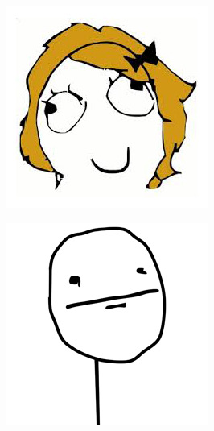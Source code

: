 \begin{multicols}{8}
\begin{center}
\includegraphics[width=\linewidth]{./IMG-GIT/MEMES/Meme-Faces-16.jpg}  
\end{center}

\begin{center}
\includegraphics[width=\linewidth]{./IMG-GIT/MEMES/Meme-Faces-25.jpg}  
\end{center}


\end{multicols}
